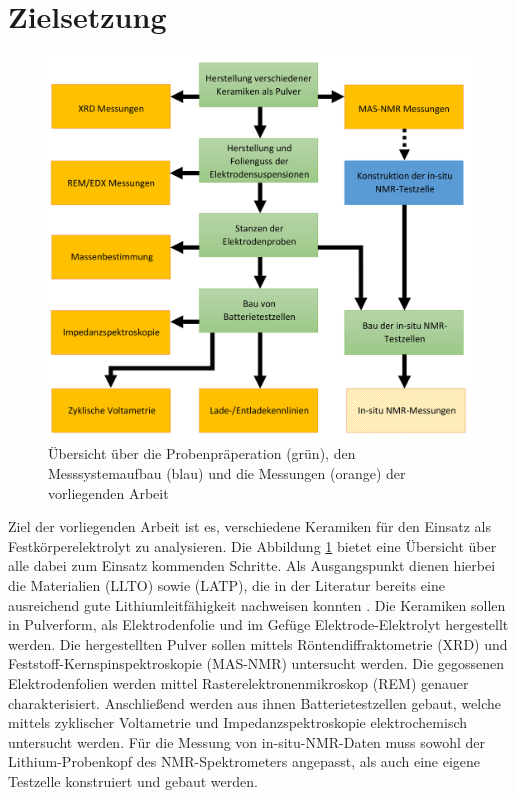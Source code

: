 \documentclass[a4paper, 11pt, headsepline,footsepline,twoside,abstract]{scrbook}
\begin{document}
\section{Zielsetzung}
\begin{figure}
	\centering
	\includegraphics[width=1.0\columnwidth]{images/Flowchart_Masterarbeit2.png}
	\caption{Übersicht über die Probenpräperation (grün), den Messsystemaufbau (blau) und die Messungen (orange) der vorliegenden Arbeit}
	\label{Flowchart_Masterarbeit}
\end{figure}
Ziel der vorliegenden Arbeit ist es, verschiedene Keramiken für den Einsatz als Festkörperelektrolyt zu analysieren. Die Abbildung \ref{Flowchart_Masterarbeit} bietet eine Übersicht über alle dabei zum Einsatz kommenden Schritte. Als Ausgangspunkt dienen hierbei die Materialien  (LLTO) sowie  (LATP), die in der Literatur bereits eine ausreichend gute Lithiumleitfähigkeit nachweisen konnten \cite{tatsumisago2013recent}. Die Keramiken sollen in Pulverform, als Elektrodenfolie und im Gefüge Elektrode-Elektrolyt hergestellt werden. Die hergestellten Pulver sollen mittels Röntendiffraktometrie (XRD) und Feststoff-Kernspinspektroskopie (MAS-NMR) untersucht werden. Die gegossenen Elektrodenfolien werden mittel Rasterelektronenmikroskop (REM) genauer charakterisiert. Anschließend werden aus ihnen Batterietestzellen gebaut, welche mittels zyklischer Voltametrie und Impedanzspektroskopie elektrochemisch untersucht werden. Für die Messung von in-situ-NMR-Daten muss sowohl der Lithium-Probenkopf des NMR-Spektrometers angepasst, als auch eine eigene Testzelle konstruiert und gebaut werden.
\end{document}
